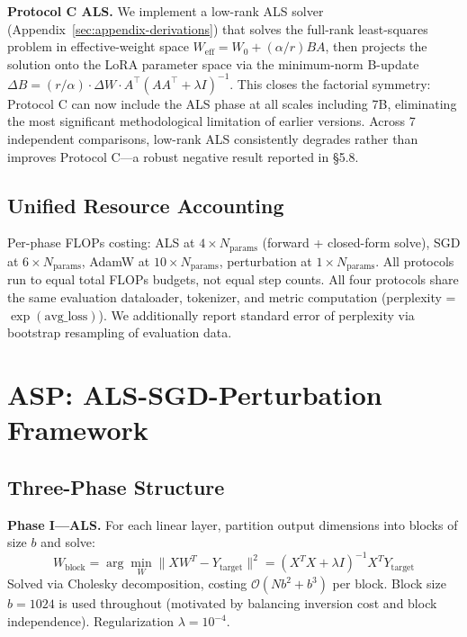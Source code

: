 \documentclass[11pt]{article}
\begin{document}
\textbf{Protocol C ALS.} We implement a low-rank ALS solver (Appendix~\ref{sec:appendix-derivations}) that solves the full-rank least-squares problem in effective-weight space $W_{\text{eff}} = W_0 + (\alpha/r)BA$, then projects the solution onto the LoRA parameter space via the minimum-norm B-update $\Delta B = (r/\alpha) \cdot \Delta W \cdot A^\top (A A^\top + \lambda I)^{-1}$. This closes the factorial symmetry: Protocol C can now include the ALS phase at all scales including 7B, eliminating the most significant methodological limitation of earlier versions. Across 7 independent comparisons, low-rank ALS consistently degrades rather than improves Protocol C---a robust negative result reported in \S5.8.

\subsection{Unified Resource Accounting}

Per-phase FLOPs costing: ALS at $4 \times N_{\text{params}}$ (forward + closed-form solve), SGD at $6 \times N_{\text{params}}$, AdamW at $10 \times N_{\text{params}}$, perturbation at $1 \times N_{\text{params}}$. All protocols run to equal total FLOPs budgets, not equal step counts. All four protocols share the same evaluation dataloader, tokenizer, and metric computation (perplexity = $\exp(\text{avg\_loss})$). We additionally report standard error of perplexity via bootstrap resampling of evaluation data.

\section{ASP: ALS-SGD-Perturbation Framework}

\subsection{Three-Phase Structure}

\textbf{Phase I---ALS.} For each linear layer, partition output dimensions into blocks of size $b$ and solve:
\begin{equation}
W_{\text{block}} = \arg\min_W \|X W^T - Y_{\text{target}}\|^2 = (X^T X + \lambda I)^{-1} X^T Y_{\text{target}}
\end{equation}
Solved via Cholesky decomposition, costing $\mathcal{O}(Nb^2 + b^3)$ per block. Block size $b=1024$ is used throughout (motivated by balancing inversion cost and block independence). Regularization $\lambda = 10^{-4}$.
\end{document}
